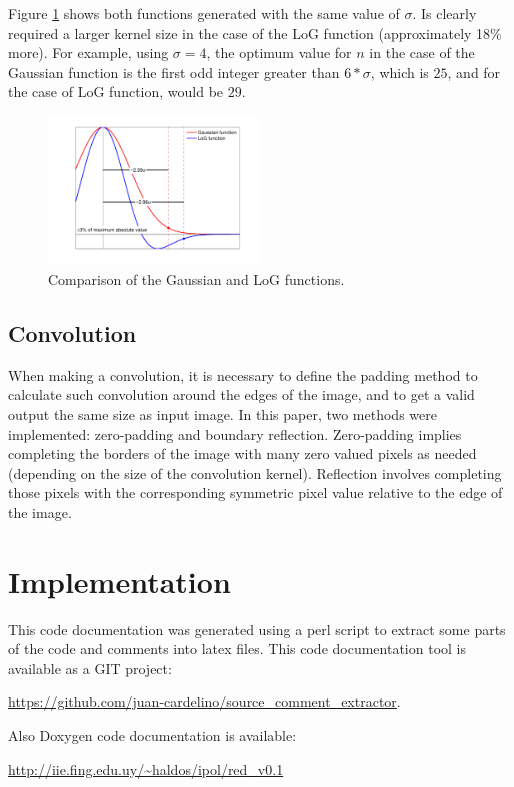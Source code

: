 \documentclass{ipol}
\numberwithin{equation}{section}
\numberwithin{table}{section}
\numberwithin{figure}{section}
\begin{document}
Figure \ref{fig:kernels} shows both functions generated with the same value of $\sigma$. Is clearly 
required a larger kernel size in the case of the LoG function (approximately 18\% more). For 
example, using $\sigma=4$, the optimum value for $n$ in the case of the Gaussian function is the 
first odd integer greater than $6*\sigma$, which is $25$, and for the case of LoG function, would 
be $29$.

\begin{figure}
	\centering
	\includegraphics[width=0.5\textwidth]{kernels.pdf}
	\caption{Comparison of the Gaussian and LoG functions.}
	\label{fig:kernels}
\end{figure}


\subsection{Convolution}

When making a convolution, it is necessary to define the padding method to calculate such convolution 
around the edges of the image, and to get a valid output the same size as input image. In this paper, 
two methods were implemented: zero-padding and boundary reflection. Zero-padding implies completing 
the borders of the image with many zero valued pixels as needed (depending on the size of the convolution 
kernel). Reflection involves completing those pixels with the corresponding symmetric pixel value 
relative to the edge of the image. \\


\section{Implementation}
\label{sec:appendix2}

This code documentation was generated using a perl script to extract some parts of the 
code and comments into latex files. This code documentation tool is available as a GIT
project: 
\begin{center} 
\url{https://github.com/juan-cardelino/source_comment_extractor}. \\
\end{center}
Also Doxygen code documentation is available:
\begin{center}
\url{http://iie.fing.edu.uy/~haldos/ipol/red_v0.1}
\end{center}
\end{document}
